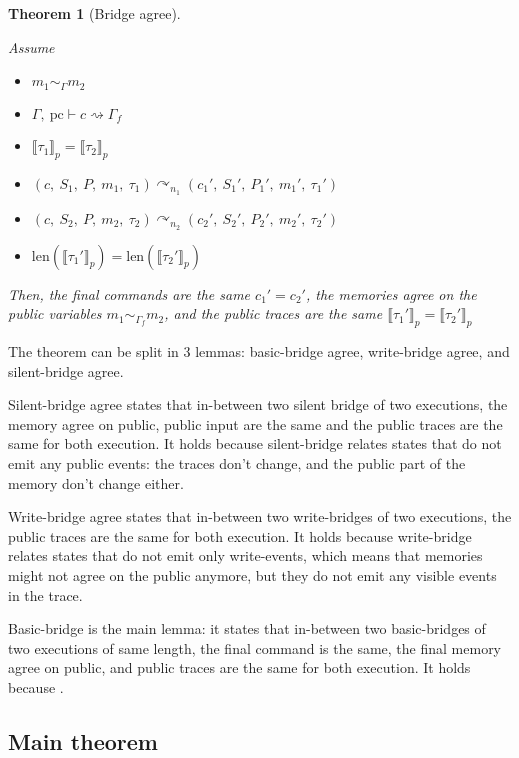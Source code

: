\documentclass[10pt]{article}
\newcommand{\pc}{\mathrm{pc}}
\newcommand{\ctx}{\Gamma}
\newcommand{\typing}[4]{ #1,~#2 \vdash #3 \rightsquigarrow #4}
\newcommand{\bridge}[3] { #1 \curvearrowright_{#2} #3 }
\newcommand{\pproj}[1]{\llbracket #1 \rrbracket_{p}}
\newcommand{\agree}[3]{#2 \sim_{#1} #3}
\newtheorem{theorem}{Theorem}
\begin{document}
\begin{theorem}[Bridge agree]\label{thm:agree}

  Assume
  \begin{itemize}
    \item $\agree{\ctx}{m_{1}}{m_{2}}$
    \item $\typing{\ctx}{\pc}{c}{\ctx_{f}}$
    \item $\pproj{\tau_{1}} = \pproj{\tau_{2}}$
    \item $\bridge{(c,~S_{1},~P,~m_{1},~\tau_{1})}{n_{1}}(c_{1}',~S_{1}',~P_{1}',~m_{1}',~\tau_{1}')$
    \item $\bridge{(c,~S_{2},~P,~m_{2},~\tau_{2})}{n_{2}}(c_{2}',~S_{2}',~P_{2}',~m_{2}',~\tau_{2}')$
    \item $\mathrm{len}(\pproj{\tau_{1}'}) = \mathrm{len}(\pproj{\tau_{2}'})$
  \end{itemize}

  Then,
  the final commands are the same $c_{1}' = c_{2}'$,
  the memories agree on the public variables $\agree{\ctx_{f}}{m_{1}}{m_{2}}$, %
  and the public traces are the same $\pproj{\tau_{1}'} = \pproj{\tau_{2}'}$
\end{theorem}

The theorem can be split in 3 lemmas: basic-bridge agree, write-bridge agree, and silent-bridge
agree.

Silent-bridge agree states that in-between two silent bridge of two executions,
the memory agree on public, public input are the same and the public
traces are the same for both execution. It holds because silent-bridge relates states that do not
emit any public events: the traces don't change, and the public part of the memory don't change
either.

Write-bridge agree states that in-between two write-bridges of two executions,
the public traces are the same for both execution. It holds because write-bridge relates states that
do not emit only write-events, which means that memories might not agree on the public anymore, but
they do not emit any visible events in the trace.

Basic-bridge is the main lemma: it states that in-between two basic-bridges of two executions of
same length, the final command is the same, the final memory agree on public, and
public traces are the same for both execution.
It holds because .


\subsection{Main theorem}%
\label{subsec:main_theorem}
\end{document}
